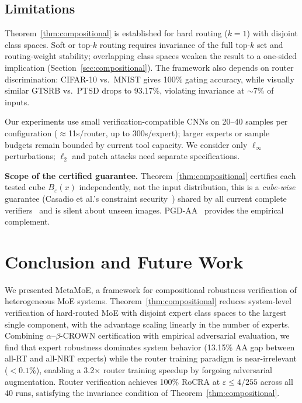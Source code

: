 \documentclass[runningheads]{llncs}
\begin{document}
\subsection{Limitations}
\label{sec:limitations}

Theorem~\ref{thm:compositional} is established for hard routing ($k{=}1$) with disjoint class spaces. Soft or top-$k$ routing requires invariance of the full top-$k$ set and routing-weight stability; overlapping class spaces weaken the result to a one-sided implication (Section~\ref{sec:compositional}). The framework also depends on router discrimination: CIFAR-10 vs.\ MNIST gives 100\% gating accuracy, while visually similar GTSRB vs.\ PTSD drops to 93.17\%, violating invariance at ${\sim}$7\% of inputs.

Our experiments use small verification-compatible CNNs on 20--40 samples per configuration (${\approx}$11s/router, up to 300s/expert); larger experts or sample budgets remain bounded by current tool capacity. We consider only $\ell_\infty$ perturbations; $\ell_2$ and patch attacks need separate specifications.

\textbf{Scope of the certified guarantee.} Theorem~\ref{thm:compositional} certifies each tested cube $B_\varepsilon(x)$ independently, not the input distribution, this is a \emph{cube-wise} guarantee (Casadio et al.'s constraint security~\cite{casadio2022}) shared by all current complete verifiers~\cite{kaulen2025} and is silent about unseen images. PGD-AA~\cite{madry2018} provides the empirical complement.

\section{Conclusion and Future Work}

We presented \textsf{MetaMoE}, a framework for compositional robustness verification of heterogeneous MoE systems. Theorem~\ref{thm:compositional} reduces system-level verification of hard-routed MoE with disjoint expert class spaces to the largest single component, with the advantage scaling linearly in the number of experts. Combining $\alpha$--$\beta$-CROWN certification with empirical adversarial evaluation, we find that expert robustness dominates system behavior (13.15\% AA gap between all-RT and all-NRT experts) while the router training paradigm is near-irrelevant ($< 0.1\%$), enabling a 3.2$\times$ router training speedup by forgoing adversarial augmentation. Router verification achieves 100\% RoCRA at $\varepsilon \leq 4/255$ across all 40 runs, satisfying the invariance condition of Theorem~\ref{thm:compositional}.
\end{document}
